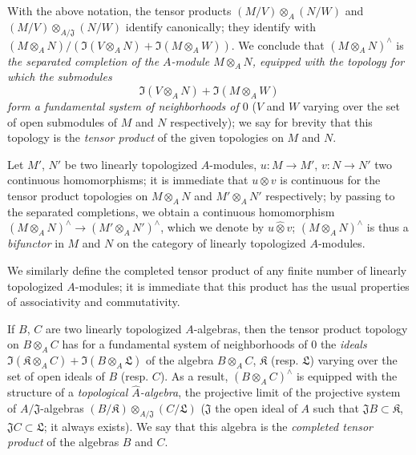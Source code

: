 \begin{env}[7.7.2]
\label{0.7.7.2}
With the above notation, the tensor products $(M/V)\otimes_A(N/W)$ and
$(M/V)\otimes_{A/\mathfrak{J}}(N/W)$ identify canonically; they identify with
$(M\otimes_A N)/(\Im(V\otimes_A N)+\Im(M\otimes_A W))$. We conclude that $(M\otimes_A N)^\wedge$
is \emph{the separated completion of the $A$-module $M\otimes_A N$, equipped with the topology for
which the submodules
\[
  \Im(V\otimes_A N)+\Im(M\otimes_A W)
\]
form a fundamental system of neighborhoods of $0$} ($V$ and $W$ varying over the set of open submodules
of $M$ and $N$ respectively); we say for brevity that this topology is the \emph{tensor product} of
the given topologies on $M$ and $N$.
\end{env}

\begin{env}[7.7.3]
\label{0.7.7.3}
Let $M'$, $N'$ be two linearly topologized $A$-modules, $u:M\to M'$, $v:N\to N'$ two continuous
homomorphisms; it is immediate that $u\otimes v$ is continuous for the tensor product topologies on
$M\otimes_A N$ and $M'\otimes_A N'$ respectively; by passing to the separated completions, we obtain
a continuous homomorphism $(M\otimes_A N)^\wedge\to(M'\otimes_A N')^\wedge$, which we denote by
$u\widehat{\otimes}v$; $(M\otimes_A N)^\wedge$ is thus a \emph{bifunctor} in $M$ and $N$ on the category
of linearly topologized $A$-modules.
\end{env}

\begin{env}[7.7.4]
\label{0.7.7.4}
We similarly define the completed tensor product of any finite number of linearly topologized
$A$-modules; it is immediate that this product has the usual properties of associativity and
commutativity.
\end{env}

\begin{env}[7.7.5]
\label{0.7.5.5}
If $B$, $C$ are two linearly topologized $A$-algebras, then the tensor product topology on
$B\otimes_A C$ has for a fundamental system of neighborhoods of $0$ the \emph{ideals}
$\Im(\mathfrak{K}\otimes_A C)+\Im(B\otimes_A\mathfrak{L})$ of the algebra $B\otimes_A C$,
$\mathfrak{K}$ (resp. $\mathfrak{L}$) varying over the set of open ideals of $B$ (resp. $C$).
As a result, $(B\otimes_A C)^\wedge$ is equipped with the structure of a \emph{topological
$\widehat{A}$-algebra}, the projective limit of the projective system of $A/\mathfrak{J}$-algebras
$(B/\mathfrak{K})\otimes_{A/\mathfrak{J}}(C/\mathfrak{L})$ ($\mathfrak{J}$ the open ideal of $A$
such that $\mathfrak{J}B\subset\mathfrak{K}$, $\mathfrak{J}C\subset\mathfrak{L}$; it always exists).
We say that this algebra is the \emph{completed tensor product} of the algebras $B$ and $C$.
\end{env}

